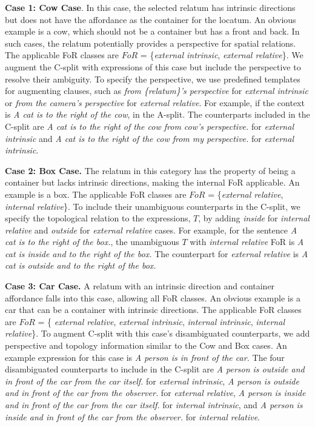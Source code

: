 \noindent\textbf{Case 1: Cow Case}.
In this case, the selected relatum has intrinsic directions but does not have the affordance as the container for the locatum.
An obvious example is a cow, which should not be a container but has a front and back.
In such cases, the relatum potentially provides a perspective for spatial relations. 
The applicable FoR classes are $FoR$ = \{\textit{external intrinsic}, \textit{external relative}\}.
We augment the C-split with expressions of this case but include the perspective to resolve their ambiguity.
To specify the perspective, we use predefined templates for augmenting clauses, such as \textit{from \{relatum\}'s perspective }for \textit{external intrinsic} or \textit{from the camera's perspective} for \textit{external relative}. 
For example, if the context is  \textit{A cat is to the right of the cow}, in the A-split. 
The counterparts included in the C-split are \textit{A cat is to the right of the cow from cow's perspective.} for \textit{external intrinsic} and \textit{A cat is to the right of the cow from my perspective.} for \textit{external intrinsic}. 


\noindent\textbf{Case 2: Box Case.} 
The relatum in this category has the property of being a container but lacks intrinsic directions, making the internal FoR applicable. An example is a box. 
The applicable FoR classes are $FoR$ = \{\textit{external relative}, \textit{internal relative}\}.
To include their unambiguous counterparts in the C-split, we specify the topological relation to the expressions, $T$, by adding \textit{inside} for \textit{internal relative} and \textit{outside} for \textit{external relative} cases. 
For example, for the sentence \textit{A cat is to the right of the box.},
the unambiguous $T$ with \textit{internal relative} FoR is \textit{A cat is inside and to the right of the box.} The counterpart for \textit{external relative} is \textit{A cat is outside and to the right of the box.}


\noindent\textbf{Case 3: Car Case.}  
A relatum with an intrinsic direction and container affordance falls into this case, allowing all FoR classes. An obvious example is a car that can be a container with intrinsic directions. The applicable FoR classes are $FoR$ = \{ \textit{external relative},  \textit{external intrinsic}, \textit{internal intrinsic}, \textit{internal relative}\}.
To augment C-split with this case's disambiguated counterparts, we add perspective and topology information similar to the Cow and Box cases.
An example expression for this case is \textit{A person is in front of the car.} 
The four disambiguated counterparts to include in the C-split are \textit{A person is outside and in front of the car from the car itself.} for \textit{external intrinsic}, \textit{A person is outside and in front of the car from the observer.} for \textit{external relative},  \textit{A person is inside and in front of the car from the car itself.} for \textit{internal intrinsic}, and \textit{A person is inside and in front of the car from the observer.} for \textit{internal relative}.

